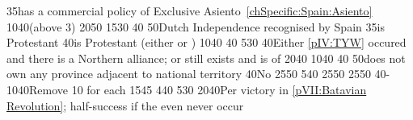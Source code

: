 %
%
%
{}{35}{\paysmajeurEspagne has a commercial policy of Exclusive
  Asiento~\ref{chSpecific:Spain:Asiento}}%
%
%
{10}{40}{\EU@objOuterProvinces (above 3)}%
%
%
{20}{50}{\EU@objSpanishWorld}%
%
%
%
%
{15}{30}{\EU@objIndependanceWars}%
%
 
%
%
{}{40}{}%
%
%
{}{50}{Dutch Independence recognised by Spain}%
%
%
{}{35}{\paysmajeurFrance is Protestant}%
%
%
{}{40}{\paysmajeurAngleterre is Protestant (either \PROTANG or \PROTPUR)}%
%
%
{10}{40}{\EU@objEastIndiesConvoy}%
%
%
%
{}{40}{}%
%
%
{5}{30}{\EU@objBaltiqueTrade}%
%
%
{}{40}{Either \ref{pIV:TYW} occured and there is a Northern \HRE alliance; or
  \payshanse still exists and is \VASSAL of \paysmajeurHollande}%
%
%
{20}{40}{\EU@objNoActNavigation}%
%
\EUobjective{}{\continentBrazil}{\COL}%
{10}{40}{\EU@objEachCOL[\continentBrazil]}%
%
%
%
{}{40}{}%
%
%
{}{50}{\paysmajeurFrance does not own any province adjacent to
  \paysmajeurHollande national territory}%
%
%
{}{40}{No \EU@objEastMalacca}%
%
%
{25}{50}{\EU@objNoActNavigation}%
%
%
{5}{40}{}%
%
%
%
{25}{50}{\EU@objEachCC}%
%
%
{25}{50}{\EU@objWoSS}%
%
%
{40-10}{40}{Remove 10 \VPs for each \EU@objEastMalacca}%
%
\EUobjective{}{\continentAmerica}{\COL}%
{15}{45}{\EU@objAmericaHOL}%
%
%
{4}{40}{\EU@objEastIndiesConvoy}%
%
%
%
{5}{30}{\EU@objMonopolyZone}%
%
%
{20}{40}{Per victory in \ref{pVII:Batavian Revolution}; half-success if the
  even never occur}%
